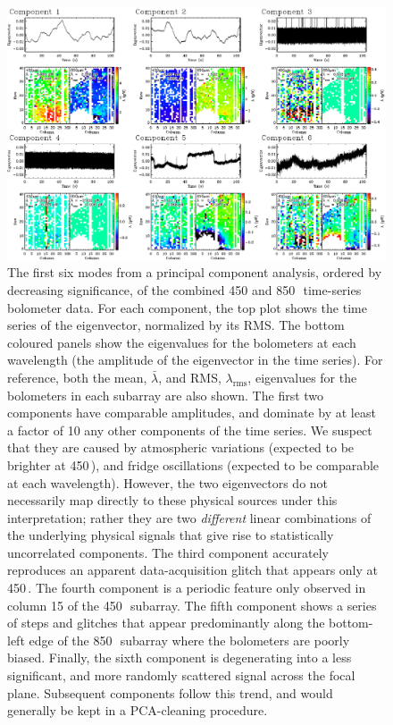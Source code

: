 \documentclass[useAMS,usenatbib,nofootinbib]{mn2e}
\newcommand{\rms}{RMS}
\begin{document}
\begin{figure}
\centering
\includegraphics[width=\linewidth]{pca.pdf}
\caption{The first six modes from a principal component analysis,
  ordered by decreasing significance, of the combined 450 and
  850\,\micron\ time-series bolometer data. For each component, the
  top plot shows the time series of the eigenvector, normalized by its
  \rms. The bottom coloured panels show the eigenvalues for the
  bolometers at each wavelength (the amplitude of the eigenvector in
  the time series). For reference, both the mean, $\bar{\lambda}$, and
  \rms, $\lambda_\mathrm{rms}$, eigenvalues for the bolometers in each
  subarray are also shown. The first two components have comparable
  amplitudes, and dominate by at least a factor of 10 any other
  components of the time series. We suspect that they are caused by
  atmospheric variations (expected to be brighter at 450\,\micron),
  and fridge oscillations (expected to be comparable at each
  wavelength). However, the two eigenvectors do not necessarily map
  directly to these physical sources under this interpretation; rather
  they are two \emph{different} linear combinations of the underlying
  physical signals that give rise to statistically uncorrelated
  components. The third component accurately reproduces an apparent
  data-acquisition glitch that appears only at 450\,\micron. The
  fourth component is a periodic feature only observed in column 15 of
  the 450\,\micron\ subarray. The fifth component shows a series of
  steps and glitches that appear predominantly along the bottom-left
  edge of the 850\,\micron\ subarray where the bolometers are poorly
  biased. Finally, the sixth component is degenerating into a less
  significant, and more randomly scattered signal across the focal
  plane. Subsequent components follow this trend, and would generally
  be kept in a PCA-cleaning procedure.}
\label{fig:pca}
\end{figure}
\end{document}
